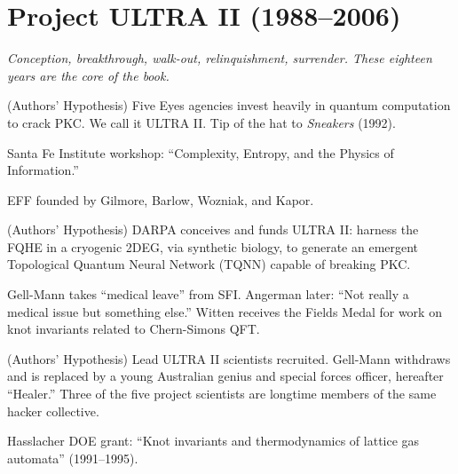 \section*{Project ULTRA II (1988--2006)}

\textit{Conception, breakthrough, walk-out, relinquishment, surrender. These eighteen years are the core of the book.}

\vspace{0.3cm}

\begin{description}[style=nextline, leftmargin=3.5cm, labelwidth=3cm]

\item[1989] (Authors' Hypothesis) Five Eyes agencies invest heavily in quantum computation to crack PKC. We call it ULTRA II. Tip of the hat to \textit{Sneakers} (1992).

\item[1989] Santa Fe Institute workshop: ``Complexity, Entropy, and the Physics of Information.''

\item[1990] EFF founded by Gilmore, Barlow, Wozniak, and Kapor.

\item[1989--90] (Authors' Hypothesis) DARPA conceives and funds ULTRA II: harness the FQHE in a cryogenic 2DEG, via synthetic biology, to generate an emergent Topological Quantum Neural Network (TQNN) capable of breaking PKC.

\item[1990] Gell-Mann takes ``medical leave'' from SFI. Angerman later: ``Not really a medical issue but something else.'' Witten receives the Fields Medal for work on knot invariants related to Chern-Simons QFT.

\item[1990--91] (Authors' Hypothesis) Lead ULTRA II scientists recruited. Gell-Mann withdraws and is replaced by a young Australian genius and special forces officer, hereafter ``Healer.'' Three of the five project scientists are longtime members of the same hacker collective.

\item[$\sim$1991] Hasslacher DOE grant: ``Knot invariants and thermodynamics of lattice gas automata'' (1991--1995).


\end{description}
